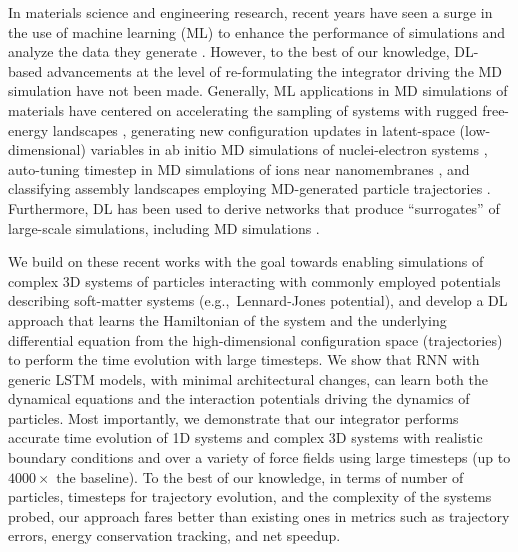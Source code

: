 \documentclass[aps,prl,twocolumn,superscriptaddress,tightenlines,longbibliography, reprint]{revtex4-1}
\newcommand{\eg}{e.g.,}
\begin{document}
In materials science and engineering research, recent years have seen a surge in the use of machine learning (ML) to enhance the performance of simulations and analyze the data they generate  \cite{ferguson2017machine,mehta2019high,butler2018machine,gcfref1,gcfref3,sam2017,melko2017,glotzer2017,wang2017mesoscale,fu2017,guo2018adaptive,botu2015adaptive,kadupitiya2020ml,kadupitiya2020ml,long2015machine,moradzadeh2019molecular}. However, to the best of our knowledge, DL-based advancements at the level of re-formulating the integrator driving the MD simulation have not been made. Generally, ML applications in MD simulations of materials have centered on accelerating the sampling of systems with rugged free-energy landscapes \cite{guo2018adaptive}, generating new configuration updates in latent-space (low-dimensional) variables in ab initio MD simulations of nuclei-electron systems \cite{botu2015adaptive}, auto-tuning timestep in MD simulations of ions near nanomembranes \cite{kadupitiya2020ml}, and classifying assembly landscapes employing MD-generated particle trajectories \cite{long2015machine}. Furthermore, DL has been used to derive networks that produce ``surrogates'' of large-scale simulations, including MD simulations \cite{aspuru2019,kadupitiya2019machine,moradzadeh2019molecular, kadupitiya2020machine,kasim2020up}. 

We build on these recent works with the goal towards enabling simulations of complex 3D systems of particles interacting with commonly employed potentials describing soft-matter systems (\eg\ Lennard-Jones potential),  and develop a DL approach that learns the Hamiltonian of the system and the underlying differential equation from the high-dimensional configuration space (trajectories) to perform the time evolution with large timesteps.  
We show that RNN with generic LSTM models, with minimal architectural changes, can learn both the dynamical equations and the interaction potentials driving the dynamics of particles. 
Most importantly, we demonstrate that our integrator performs accurate time evolution of 1D systems and complex 3D systems with realistic boundary conditions and over a variety of force fields using large timesteps (up to $4000\times$ the baseline). To the best of our knowledge, in terms of number of particles, timesteps for trajectory evolution, and the complexity of the systems probed, our approach fares better than existing ones in metrics such as trajectory errors, energy conservation tracking, and net speedup.
\end{document}

